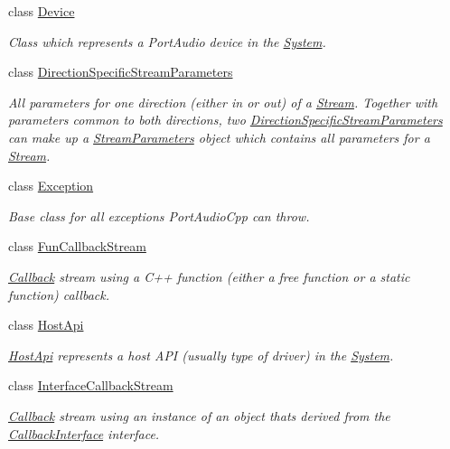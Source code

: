 \begin{DoxyCompactItemize}
class \hyperlink{classportaudio_1_1_device}{Device}
\begin{DoxyCompactList}\small\item\em Class which represents a Port\+Audio device in the \hyperlink{classportaudio_1_1_system}{System}. \end{DoxyCompactList}\item 
class \hyperlink{classportaudio_1_1_direction_specific_stream_parameters}{Direction\+Specific\+Stream\+Parameters}
\begin{DoxyCompactList}\small\item\em All parameters for one direction (either in or out) of a \hyperlink{classportaudio_1_1_stream}{Stream}. Together with parameters common to both directions, two \hyperlink{classportaudio_1_1_direction_specific_stream_parameters}{Direction\+Specific\+Stream\+Parameters} can make up a \hyperlink{classportaudio_1_1_stream_parameters}{Stream\+Parameters} object which contains all parameters for a \hyperlink{classportaudio_1_1_stream}{Stream}. \end{DoxyCompactList}\item 
class \hyperlink{classportaudio_1_1_exception}{Exception}
\begin{DoxyCompactList}\small\item\em Base class for all exceptions Port\+Audio\+Cpp can throw. \end{DoxyCompactList}\item 
class \hyperlink{classportaudio_1_1_fun_callback_stream}{Fun\+Callback\+Stream}
\begin{DoxyCompactList}\small\item\em \hyperlink{class_callback}{Callback} stream using a C++ function (either a free function or a static function) callback. \end{DoxyCompactList}\item 
class \hyperlink{classportaudio_1_1_host_api}{Host\+Api}
\begin{DoxyCompactList}\small\item\em \hyperlink{classportaudio_1_1_host_api}{Host\+Api} represents a host A\+PI (usually type of driver) in the \hyperlink{classportaudio_1_1_system}{System}. \end{DoxyCompactList}\item 
class \hyperlink{classportaudio_1_1_interface_callback_stream}{Interface\+Callback\+Stream}
\begin{DoxyCompactList}\small\item\em \hyperlink{class_callback}{Callback} stream using an instance of an object that\textquotesingle{}s derived from the \hyperlink{classportaudio_1_1_callback_interface}{Callback\+Interface} interface. \end{DoxyCompactList}\item 

\end{DoxyCompactItemize}

